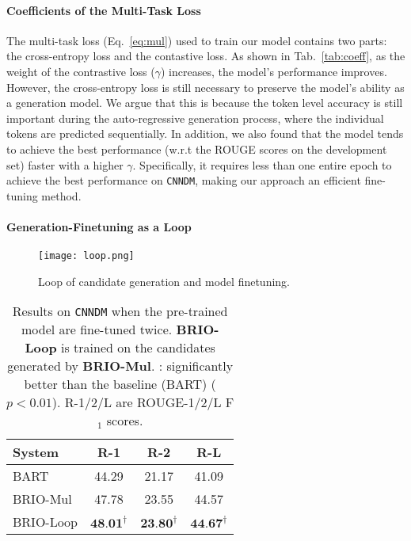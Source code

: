 \documentclass[11pt]{article}
\newcommand{\model}{BRIO\xspace}
\begin{document}
\paragraph{Coefficients of the Multi-Task Loss} The multi-task loss (Eq.~\ref{eq:mul}) used to train our model contains two parts: the cross-entropy loss and the contastive loss. 
As shown in Tab.~\ref{tab:coeff}, as the weight of the contrastive loss ($\gamma$) increases, the model's performance improves. 
However, the cross-entropy loss is still necessary to preserve the model's ability as a generation model.
We argue that this is because the token level accuracy is still important during the auto-regressive generation process, where the individual tokens are predicted sequentially. 
In addition, we also found that the model tends to achieve the best performance (w.r.t the ROUGE scores on the development set) faster with a higher $\gamma$.
Specifically, it requires less than one entire epoch to achieve the best performance on \texttt{CNNDM}, making our approach an efficient fine-tuning method.

\paragraph{Generation-Finetuning as a Loop}

\begin{figure}[t!]
    \centering
    \texttt{[image: loop.png]}
    \caption{Loop of candidate generation and model finetuning. }
    \label{fig:loop}
\end{figure}

\begin{table}[t!]
\centering
\small
\begin{tabular}{lccc}
\toprule
\textbf{System} & \textbf{R-1} & \textbf{R-2} & \textbf{R-L}  \\
\midrule
 BART & 44.29 & 21.17 & 41.09 \\
 \model-Mul & 47.78 & 23.55 & 44.57 \\
 \midrule
 \model-Loop & $\textbf{48.01}^\dag$ & $\textbf{23.80}^\dag$ & $\textbf{44.67}^\dag$ \\
\bottomrule
\end{tabular}
\caption{\label{tab:loop} Results on \texttt{CNNDM} when the pre-trained model are fine-tuned twice.
\textbf{\model-Loop} is trained on the candidates generated by \textbf{\model-Mul}.
\dag: significantly better than the baseline (BART) ($p < 0.01$).
R-1/2/L are ROUGE-1/2/L F$_1$ scores.}
\end{table}
\end{document}
